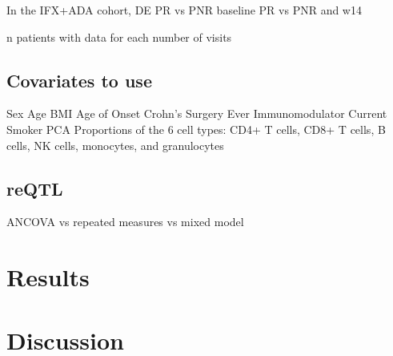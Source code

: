 In the IFX+ADA cohort, 
    DE
    PR vs PNR baseline
    PR vs PNR and w14

n patients with data for each number of visits

\subsection{Covariates to use}

Sex
Age
BMI
Age of Onset
Crohn’s Surgery
Ever Immunomodulator
Current Smoker
PCA
Proportions of the 6 cell types: CD4+ T cells, CD8+ T cells, B cells, NK cells, monocytes, and granulocytes

\subsection{reQTL}


ANCOVA vs repeated measures vs mixed model


\section{Results}

\section{Discussion}


